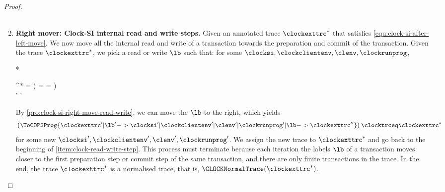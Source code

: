 \begin{proof}
\begin{enumerate}
\begin{multline}
    \label{equ:clock-si-after-left-move}
    \end{multline}
\item \textbf{Right mover: Clock-SI internal read and write steps.}
\label{item:clock-read-write-step}
    Given an annotated trace \( \clockexttrc^* \) that satisfies \cref{equ:clock-si-after-left-move}.
    We now move all the internal read and write of a transaction towards the preparation and commit of the transaction.
    Given the trace \( \clockexttrc^* \), we pick a read or write \( \lb \) such that:
    for some  \( \clocksi, \clockclientenv, \clenv, \clockrunprog\),
    \begin{Formulae}*
    \begin{Formula}
        \clockexttrc^* =  
        \land \left(
        \lb = 
        \lor \lb = 
        \right)
        \\ {} \land {}
        \lb' \neq {}
        \land \lb' \neq {} 
    \end{Formula}
    \end{Formulae}
    By \cref{pro:clock-si-right-move-read-write}, we can move the \( \lb \) to the right,
    which yields
    \[
        \left( \ToCOPSProg{\clockexttrc' | \lb' 
            -> \clocksi' | \clockclientenv' | \clenv' | \clockrunprog' | \lb -> \clockexttrc'' }  \right)
        \clocktrceq \clockexttrc^*
    \]
    for some new \( \clocksi', \clockclientenv', \clenv', \clockrunprog'\).
    We assign the new trace to \( \clockexttrc^*\) and go back to the beginning of \cref{item:clock-read-write-step}.
    This process must terminate because each iteration the labels \(\lb \) of a transaction
    moves closer to the first preparation step or commit step of the same transaction,
    and there are only finite transactions in the trace.
    In the end, the trace \( \clockexttrc^*\) is a normalised trace,
    that is, \( \CLOCKNormalTrace(\clockexttrc^*)\). \qedhere
\end{enumerate}
\end{proof}

